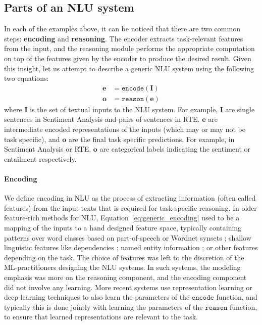 \subsection{Parts of an NLU system}
In each of the examples above, it can be noticed that there are two common steps: \textbf{encoding}
and \textbf{reasoning}. The encoder extracts task-relevant features from the input, and the
reasoning module performs the appropriate computation on top of the features given by the encoder to
produce the desired result. Given this insight, let us attempt to describe a generic NLU system
using the following two equations: \begin{align} \mathbf{e} &= \mathtt{encode}(\mathbf{I})
\label{eq:generic_encoding}\\ \mathbf{o} &= \mathtt{reason}(\mathbf{e}) \label{eq:generic_reasoning}
\end{align} where $\mathbf{I}$ is the set of textual inputs to the NLU system.  For example,
$\mathbf{I}$  are single sentences in Sentiment Analysis and pairs of sentences in RTE\@.
$\textbf{e}$ are intermediate encoded representations of the inputs (which may or may not be task
specific), and $\mathbf{o}$ are the final task specific predictions. For example, in Sentiment
Analysis or RTE, $\mathbf{o}$ are categorical labels indicating the sentiment or entailment
respectively.

\paragraph{Encoding} We define encoding in NLU as the process of extracting information (often called
features) from the input texts that is required for task-specific reasoning.
In older feature-rich methods for NLU, Equation~\ref{eq:generic_encoding} used
to be a mapping of the inputs to a hand designed feature space, typically containing patterns over
word classes based on part-of-speech \citep{corley2005measuring} or Wordnet synsets
\citep{moldovan2001logic}; shallow linguistic features like dependencies \citep{bos2005recognising};
named entity information \citep{tatu2005semantic}; or other features depending on the task. The
choice of features was left to the discretion of the ML-practitioners designing the NLU systems. In
such systems, the modeling emphasis was more on the reasoning component, and the encoding component
did not involve any learning.  More recent systems \citep[among many
others]{bahdanau:14,weston2014memory,hermann2015teaching,Xiong2016DynamicMN,bowman2016fast,yang:16}
use representation learning or deep learning techniques to also learn the parameters of the
$\mathtt{encode}$ function, and typically this is done jointly with learning the parameters of the
$\mathtt{reason}$ function, to ensure that learned representations are relevant to the task.

